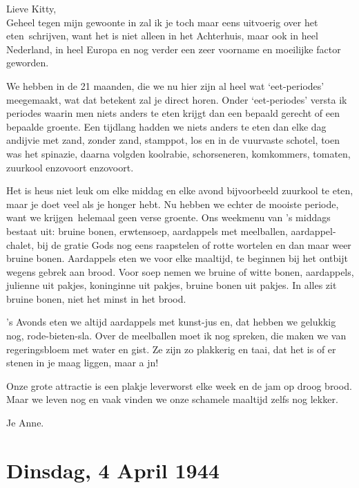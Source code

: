 \documentclass{book}
\begin{document}
Lieve Kitty,\\Geheel tegen mijn gewoonte in zal ik je toch maar eens
uitvoerig over het eten~schrijven, want het is niet alleen in het
Achterhuis, maar ook in heel Nederland, in heel Europa en nog verder een
zeer voorname en moeilijke factor geworden.

We hebben in de 21 maanden, die we nu hier zijn al heel wat
`eet-periodes' meegemaakt, wat dat betekent zal je direct horen. Onder
`eet-periodes' versta ik periodes waarin men niets anders te eten krijgt
dan een bepaald gerecht of een bepaalde groente. Een tijdlang hadden we
niets anders te eten dan elke dag andijvie met zand, zonder zand,
stamppot, los en in de vuurvaste schotel, toen was het spinazie, daarna
volgden koolrabie, schorseneren, komkommers, tomaten, zuurkool enzovoort
enzovoort.

Het is heus niet leuk om elke middag en elke avond bijvoorbeeld zuurkool
te eten, maar je doet veel als je honger hebt. Nu hebben we echter de
mooiste periode, want we krijgen~helemaal geen verse groente. Ons
weekmenu van 's middags bestaat uit: bruine bonen, erwtensoep,
aardappels met meelballen, aardappel-chalet, bij de gratie Gods nog eens
raapstelen of rotte wortelen en dan maar weer bruine bonen. Aardappels
eten we voor elke maaltijd, te beginnen bij het ontbijt wegens gebrek
aan brood. Voor soep nemen we bruine of witte bonen, aardappels,
julienne uit pakjes, koninginne uit pakjes, bruine bonen uit pakjes. In
alles zit bruine bonen, niet het minst in het brood.

's Avonds eten we altijd aardappels met kunst-jus en, dat hebben we
gelukkig nog, rode-bieten-sla. Over de meelballen moet ik nog spreken,
die maken we van regeringsbloem met water en gist. Ze zijn zo plakkerig
en taai, dat het is of er stenen in je maag liggen, maar a jn!

Onze grote attractie is een plakje leverworst elke week en de jam op
droog brood. Maar we leven nog en vaak vinden we onze schamele maaltijd
zelfs nog lekker.

Je Anne.

\chapter{Dinsdag, 4 April 1944}
\end{document}
